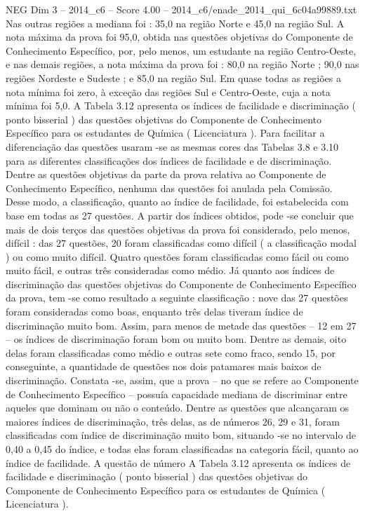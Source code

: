 \begin{textsample}{NEG Dim 3 – 2014\_c6 – Score 4.00 – 2014\_c6/enade\_2014\_qui\_6c04a99889.txt}
Nas outras regiões a mediana foi : 35,0 na região Norte e 45,0 na região Sul.
A nota máxima da prova foi 95,0, obtida nas questões objetivas do Componente de Conhecimento Específico, por, pelo menos, um estudante na região Centro-Oeste, e nas demais regiões, a nota máxima da prova foi : 80,0 na região Norte ; 90,0 nas regiões Nordeste e Sudeste ; e 85,0 na região Sul.
Em quase todas as regiões a nota mínima foi zero, à exceção das regiões Sul e Centro-Oeste, cuja a nota mínima foi 5,0.
A Tabela 3.12 apresenta os índices de facilidade e discriminação ( ponto bisserial ) das questões objetivas do Componente de Conhecimento Específico para os estudantes de Química ( Licenciatura ).
Para facilitar a diferenciação das questões usaram -se as mesmas cores das Tabelas 3.8 e 3.10 para as diferentes classificações dos índices de facilidade e de discriminação.
Dentre as questões objetivas da parte da prova relativa ao Componente de Conhecimento Específico, nenhuma das questões foi anulada pela Comissão.
Desse modo, a classificação, quanto ao índice de facilidade, foi estabelecida com base em todas as 27 questões.
A partir dos índices obtidos, pode -se concluir que mais de dois terços das questões objetivas da prova foi considerado, pelo menos, difícil : das 27 questões, 20 foram classificadas como difícil ( a classificação modal ) ou como muito difícil.
Quatro questões foram classificadas como fácil ou como muito fácil, e outras três consideradas como médio.
Já quanto aos índices de discriminação das questões objetivas do Componente de Conhecimento Específico da prova, tem -se como resultado a seguinte classificação : nove das 27 questões foram consideradas como boas, enquanto três delas tiveram índice de discriminação muito bom.
Assim, para menos de metade das questões – 12 em 27 – os índices de discriminação foram bom ou muito bom.
Dentre as demais, oito delas foram classificadas como médio e outras sete como fraco, sendo 15, por conseguinte, a quantidade de questões nos dois patamares mais baixos de discriminação.
Constata -se, assim, que a prova – no que se refere ao Componente de Conhecimento Específico – possuía capacidade mediana de discriminar entre aqueles que dominam ou não o conteúdo.
Dentre as questões que alcançaram os maiores índices de discriminação, três delas, as de números 26, 29 e 31, foram classificadas com índice de discriminação muito bom, situando -se no intervalo de 0,40 a 0,45 do índice, e todas elas foram classificadas na categoria fácil, quanto ao índice de facilidade.
A questão de número A Tabela 3.12 apresenta os índices de facilidade e discriminação ( ponto bisserial ) das questões objetivas do Componente de Conhecimento Específico para os estudantes de Química ( Licenciatura ).

\end{textsample}
